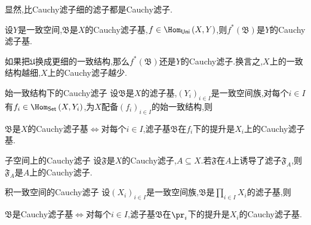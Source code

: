 \begin{remark}{}{}
	显然,比Cauchy滤子细的滤子都是Cauchy滤子.
\end{remark}

\begin{proposition}{}{}
	设$Y$是一致空间,$\mathfrak{B}$是$X$的Cauchy滤子基,$f\in\Hom_{\mathsf{Uni}}\left(X,Y\right)$,则$f^{\ast}\left(\mathfrak{B}\right)$是$Y$的Cauchy滤子基.
\end{proposition}

\begin{remark}{}{}
	如果把$\mathfrak{U}$换成更细的一致结构,那么$f^{\ast}\left(\mathfrak{B}\right)$还是$Y$的Cauchy滤子.换言之,$X$上的一致结构越细,$X$上的Cauchy滤子越少.
\end{remark}

\begin{proposition}{始一致结构下的Cauchy滤子}{}
	设$\mathfrak{B}$是$X$的滤子基,$\left(Y_{i}\right)_{i\in I}$是一致空间族,对每个$i\in I$有$f_{i}\in\Hom_{\mathsf{Set}}\left(X,Y_{i}\right)$,为$X$配备$\left(f_{i}\right)_{i\in I}$的始一致结构,则
	\begin{center}
		$\mathfrak{B}$是$X$的Cauchy滤子基$\iff$对每个$i\in I$,滤子基$\mathfrak{B}$在$f_{i}$下的提升是$X_{i}$上的Cauchy滤子基.
	\end{center}
\end{proposition}

\begin{corollary}{子空间上的Cauchy滤子}{}
	设$\mathfrak{F}$是$X$的Cauchy滤子,$A\subseteq X$.若$\mathfrak{F}$在$A$上诱导了滤子$\mathfrak{F}_{A}$,则$\mathfrak{F}_{A}$是$A$上的Cauchy滤子.
\end{corollary}

\begin{corollary}{积一致空间的Cauchy滤子}{}
	设$\left(X_{i}\right)_{i\in I}$是一致空间族,$\mathfrak{B}$是$\prod\limits_{i\in I}X_{i}$的滤子基,则
	\begin{center}
		$\mathfrak{B}$是Cauchy滤子基$\iff$对每个$i\in I$,滤子基$\mathfrak{B}$在$\pr_{i}$下的提升是$X_{i}$的Cauchy滤子基.
	\end{center}
\end{corollary}